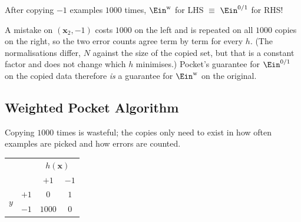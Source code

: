 \begin{moral}
    After copying \(-1\) examples \(1000\) times, \(\Ein^{\mathrm{w}}\) for LHS
    \(\equiv\) \(\Ein^{0/1}\) for RHS!
\end{moral}

A mistake on \((\bm{x}_2, -1)\) costs \(1000\) on the left and is repeated on
all \(1000\) copies on the right, so the two error counts agree term by term
for every \(h\). (The normalisations differ, \(N\) against the size of the
copied set, but that is a constant factor and does not change which \(h\)
minimises.) Pocket's guarantee for \(\Ein^{0/1}\) on the copied data therefore
\emph{is} a guarantee for \(\Ein^{\mathrm{w}}\) on the original.

\subsection{Weighted Pocket Algorithm}

Copying \(1000\) times is wasteful; the copies only need to exist in how often
examples are picked and how errors are counted.

\begin{center}
    \solidrules
    \qquad
    \begin{tabular}[b]{@{}cc|cc@{}}
        \toprule
        & & \multicolumn{2}{c}{\(h(\bm{x})\)}\\
        & & \(+1\) & \(-1\)\\
        \midrule
        \multirow{2}{*}{\(y\)} & \(+1\) & \(0\) & \(1\)\\
        & \(-1\) & \(1000\) & \(0\)\\
        \bottomrule
    \end{tabular}
\end{center}


